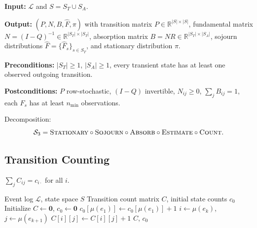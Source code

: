 \begin{definition}
\label{def:contract-s3}
\textbf{Input:} $\mathcal{L}$ and $S = S_T \cup S_A$.

\textbf{Output:} $(P, N, B, \hat{F}, \pi)$ with transition matrix
$P \in \mathbb{R}^{|S| \times |S|}$, fundamental matrix
$N = (I-Q)^{-1} \in \mathbb{R}^{|S_T| \times |S_T|}$, absorption matrix
$B = NR \in \mathbb{R}^{|S_T| \times |S_A|}$, sojourn distributions
$\hat{F} = \{\hat{F}_s\}_{s \in S_T}$, and stationary distribution $\pi$.

\textbf{Preconditions:} $|S_T| \geq 1$, $|S_A| \geq 1$, every transient
state has at least one observed outgoing transition.

\textbf{Postconditions:} $P$ row-stochastic, $(I - Q)$ invertible,
$N_{ij} \geq 0$, $\sum_j B_{ij} = 1$, each $\hat{F}_s$ has at least
$n_{\min}$ observations.
\end{definition}

Decomposition:
\begin{equation}
\label{eq:s3-decomposition}
\mathcal{S}_3 = \textsc{Stationary} \circ \textsc{Sojourn} \circ
    \textsc{Absorb} \circ \textsc{Estimate} \circ \textsc{Count}.
\end{equation}


\subsection{Transition Counting}
\label{sec:s3-counting}

\begin{property}
\label{prop:count-consistency}
$\sum_j C_{ij} = c_{i \cdot}$ for all $i$.
\end{property}

\begin{algorithm}[htbp]
\caption{Transition Count Extraction}
\label{alg:counting}
\begin{algorithmic}[1]
\REQUIRE Event log $\mathcal{L}$, state space $S$
\ENSURE Transition count matrix $C$, initial state counts $c_0$
\STATE Initialize $C \gets \mathbf{0}$, $c_0 \gets \mathbf{0}$
    \STATE $c_0[\mu(e_1)] \gets c_0[\mu(e_1)] + 1$
        \STATE $i \gets \mu(e_k)$, $j \gets \mu(e_{k+1})$
        \STATE $C[i][j] \gets C[i][j] + 1$
    \ENDFOR
\ENDFOR
\RETURN $C$, $c_0$
\end{algorithmic}
\end{algorithm}


